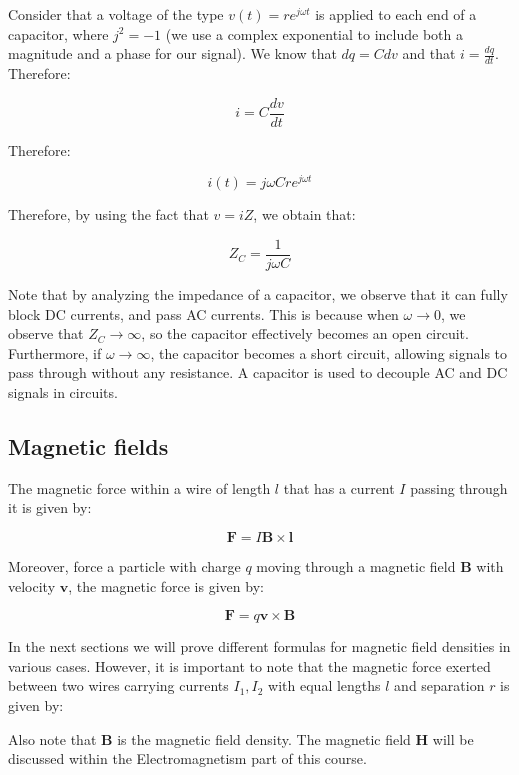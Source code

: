 \documentclass{article}
\begin{document}
\begin{proposition}
    Consider that a voltage of the type $v(t) = re^{j\omega t}$ is applied to each end of a capacitor, where $j^2 = -1$ (we use a complex exponential to include both a magnitude and a phase for our signal). We know that $dq = Cdv$ and that $i = \frac{dq}{dt}$. Therefore:

    \[ i = C\frac{dv}{dt} \]

    Therefore:

    \[ i(t) = j\omega Cre^{j\omega t} \]

    Therefore, by using the fact that $v = iZ$, we obtain that:

    \[ Z_C = \frac{1}{j\omega C} \]
\end{proposition}

Note that by analyzing the impedance of a capacitor, we observe that it can fully block DC currents, and pass AC currents. This is because when $\omega \to 0$, we observe that $Z_C \to \infty$, so the capacitor effectively becomes an open circuit. Furthermore, if $\omega \to \infty$, the capacitor becomes a short circuit, allowing signals to pass through without any resistance. A capacitor is used to decouple AC and DC signals in circuits.

\newpage

\subsection{Magnetic fields}

\begin{definition}
    The magnetic force within a wire of length $l$ that has a current $I$ passing through it is given by:

    \[ \mathbf{F} = I\mathbf{B} \times \mathbf{l} \]

    Moreover, force a particle with charge $q$ moving through a magnetic field $\mathbf{B}$ with velocity $\mathbf{v}$, the magnetic force is given by:

    \[ \mathbf{F} = q\mathbf{v} \times \mathbf{B} \]
\end{definition}

In the next sections we will prove different formulas for magnetic field densities in various cases. However, it is important to note that the magnetic force exerted between two wires carrying currents $I_1, I_2$ with equal lengths $l$ and separation $r$ is given by:

Also note that $\mathbf{B}$ is the magnetic field density. The magnetic field $\mathbf{H}$ will be discussed within the Electromagnetism part of this course.
\end{document}
